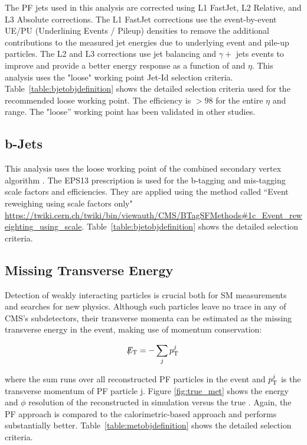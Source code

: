 The PF jets used in this analysis are corrected using L1 FastJet, L2 Relative, and L3 Absolute corrections. The L1 FastJet corrections use the event-by-event UE/PU (Underlining Events / Pileup) densities to remove the additional contributions to the measured jet energies due to underlying event and pile-up particles. The L2 and L3 corrections use jet balancing and \ensuremath{\gamma+} jets events to improve and provide a better energy response as a function of \pt and \ensuremath{\eta}. This analysis uses the "loose" working point Jet-Id selection criteria. Table~\ref{table:bjetobjdefinition} shows the detailed selection criteria used for the recommended loose working point. The efficiency is $> 98$ for the entire $\eta$ and \pt range. The "loose'' working point has been validated in other studies.

\subsection{b-Jets} 
This analysis uses the loose working point of the combined secondary vertex algorithm \cite{CMS:2011cra}. The EPS13 prescription is used for the b-tagging and mis-tagging scale factors and efficiencies. They are applied using the method called ``Event reweighing using scale factors only" \url{https://twiki.cern.ch/twiki/bin/viewauth/CMS/BTagSFMethods\#1c\_Event\_reweighting\_using\_scale}. Table~\ref{table:bjetobjdefinition} shows the detailed selection criteria.

\subsection{Missing Transverse Energy}

Detection of weakly interacting particles is crucial both for SM measurements and searches for new physics. Although such particles leave no trace in any of CMS’s subdetectors, their transverse momenta can be estimated as the missing transverse energy in the event, making use of momentum conservation:

\begin{equation}
\slash\mkern-12mu{E}_{\text{T}} =  - \sum_{j} p_{\text{T}}^{j}
\end{equation}
 
where the sum runs over all reconstructed PF particles in the event and \ensuremath{\pt^{j}} is the transverse momentum of PF particle j. Figure \ref{fig:true_met} shows the energy and \ensuremath{\phi} resolution of the reconstructed \met in simulation versus the true \met. Again, the PF approach is compared to the calorimetric-based approach and performs substantially better. Table~\ref{table:metobjdefinition} shows the detailed selection criteria.

